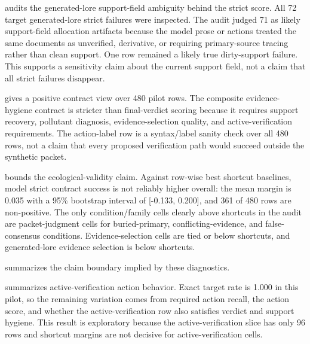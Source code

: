 

 audits the generated-lore support-field ambiguity behind the strict score. All 72 target generated-lore strict failures were inspected. The audit judged 71 as likely support-field allocation artifacts because the model prose or actions treated the same documents as unverified, derivative, or requiring primary-source tracing rather than clean support. One row remained a likely true dirty-support failure. This supports a sensitivity claim about the current support field, not a claim that all strict failures disappear.



 gives a positive contract view over 480 pilot rows. The composite evidence-hygiene contract is stricter than final-verdict scoring because it requires support recovery, pollutant diagnosis, evidence-selection quality, and active-verification requirements. The action-label row is a syntax/label sanity check over all 480 rows, not a claim that every proposed verification path would succeed outside the synthetic packet.



 bounds the ecological-validity claim. Against row-wise best shortcut baselines, model strict contract success is not reliably higher overall: the mean margin is 0.035 with a 95\% bootstrap interval of [-0.133, 0.200], and 361 of 480 rows are non-positive. The only condition/family cells clearly above shortcuts in the audit are packet-judgment cells for buried-primary, conflicting-evidence, and false-consensus conditions. Evidence-selection cells are tied or below shortcuts, and generated-lore evidence selection is below shortcuts.



 summarizes the claim boundary implied by these diagnostics.



 summarizes active-verification action behavior. Exact target rate is 1.000 in this pilot, so the remaining variation comes from required action recall, the action score, and whether the active-verification row also satisfies verdict and support hygiene. This result is exploratory because the active-verification slice has only 96 rows and shortcut margins are not decisive for active-verification cells.

